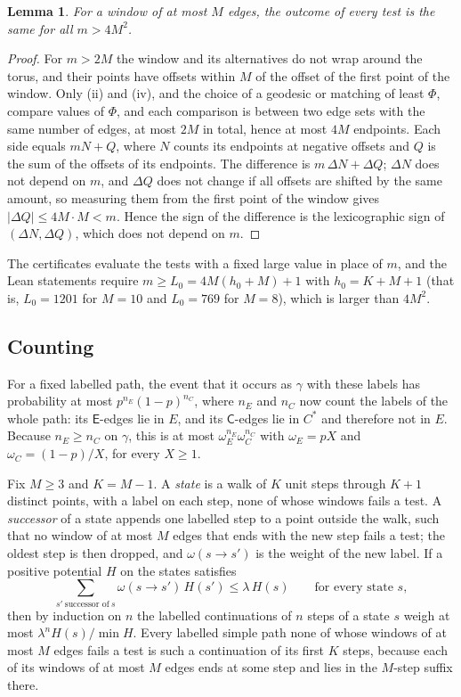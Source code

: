 \documentclass[11pt]{amsart}
\newtheorem{lemma}[theorem]{Lemma}
\theoremstyle{definition}
\theoremstyle{remark}
\numberwithin{equation}{section}
\begin{document}
\begin{lemma}\label{cnt:lem-seam}
For a window of at most $M$ edges, the outcome of every test is the same for all $m>4M^2$.
\end{lemma}

\begin{proof}
For $m>2M$ the window and its alternatives do not wrap around the torus, and their points have offsets within $M$ of
the offset of the first point of the window. Only (ii) and (iv), and the choice of a geodesic or matching of least
$\Phi$, compare values of $\Phi$, and each comparison is between two edge sets with the same number of edges, at most
$2M$ in total, hence at most $4M$ endpoints. Each side equals $mN+Q$, where $N$ counts its endpoints at negative offsets
and $Q$ is the sum of the offsets of its endpoints. The difference is $m\,\Delta N+\Delta Q$; $\Delta N$ does not
depend on $m$, and $\Delta Q$ does not change if all offsets are shifted by the same amount, so measuring them from the
first point of the window gives $|\Delta Q|\le4M\cdot M<m$. Hence the sign of the difference is the lexicographic sign
of $(\Delta N,\Delta Q)$, which does not depend on $m$.
\end{proof}

The certificates evaluate the tests with a fixed large value in place of $m$, and the Lean statements require
$m\ge L_0=4M(h_0+M)+1$ with $h_0=K+M+1$ (that is, $L_0=1201$ for $M=10$ and $L_0=769$ for $M=8$), which is larger than
$4M^2$.

\subsection{Counting}\label{cnt:count}
For a fixed labelled path, the event that it occurs as $\gamma$ with these labels has probability at most
$p^{n_E}(1-p)^{n_C}$, where $n_E$ and $n_C$ now count the labels of the whole path: its $\mathsf E$-edges lie in $E$,
and its $\mathsf C$-edges lie in $C^\ast$ and therefore not in $E$. Because $n_E\ge n_C$ on $\gamma$, this is at most
$\omega_E^{n_E}\omega_C^{n_C}$ with $\omega_E=pX$ and $\omega_C=(1-p)/X$, for every $X\ge1$.

Fix $M\ge3$ and $K=M-1$. A \emph{state} is a walk of $K$ unit steps through $K+1$ distinct points, with a label on
each step, none of whose windows fails a test. A \emph{successor} of a state appends one labelled step to a point
outside the walk, such that no window of at most $M$ edges that ends with the new step fails a test; the oldest step is
then dropped, and $\omega(s\to s')$ is the weight of the new label. If a positive potential $H$ on the states satisfies
\begin{equation}\label{cnt:row}
  \sum_{s'\ \text{successor of}\ s}\omega(s\to s')\,H(s')\le\lambda\,H(s)\qquad\text{for every state }s,
\end{equation}
then by induction on $n$ the labelled continuations of $n$ steps of a state $s$ weigh at most
$\lambda^{n}H(s)/\min H$. Every labelled simple path none of whose windows of at most $M$ edges fails a test is such a
continuation of its first $K$ steps, because each of its windows of at most $M$ edges ends at some step and lies in the
$M$-step suffix there.
\end{document}
